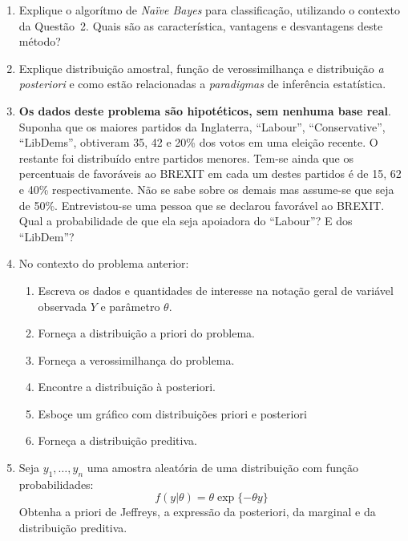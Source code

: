 \documentclass[11pt,a4]{article}\usepackage[]{graphicx}\usepackage[]{xcolor}
\begin{document}
\begin{enumerate}
\item Explique o algorítmo de {\it Naïve Bayes} para classificação, utilizando o contexto da Questão~2. Quais são as característica, vantagens e desvantagens deste método?
  

\item Explique distribuição amostral, função de verossimilhança e distribuição {\it a posteriori} e como estão relacionadas a {\it paradigmas} de inferência estatística.


 \item{ {\bf Os dados deste problema são hipotéticos, sem nenhuma base real}.\\
  Suponha que os maiores partidos da Inglaterra,
  ``Labour'', ``Conservative'', ``LibDems'',  obtiveram 35, 42 e 20\% dos votos em uma eleição recente.
  O restante foi distribuído entre partidos menores.
  Tem-se ainda que os percentuais de favoráveis ao BREXIT em cada um destes partidos é
  de 15, 62 e 40\% respectivamente. Não se sabe sobre os demais mas assume-se que seja de 50\%.
  Entrevistou-se uma pessoa que se declarou favorável ao BREXIT.
  Qual a probabilidade de que ela seja apoiadora do ``Labour''? E dos ``LibDem''?
  }
  

  
\item{ No contexto do problema anterior:
  \begin{enumerate}
  \item Escreva os dados e quantidades de interesse na notação geral de variável observada $Y$ e parâmetro $\theta$.
  \item Forneça a distribuição a priori do problema.
  \item Forneça a verossimilhança do problema.
  \item Encontre a distribuição à posteriori.
  \item Esboçe um gráfico com distribuições priori e posteriori
  \item Forneça a distribuição preditiva.
  \end{enumerate}
  }
  



  
\item Seja $y_1, \ldots, y_n$ uma amostra aleatória de uma distribuição com função probabilidades:
\[ f(y|\theta) = \theta \exp\{-\theta y\} \]
Obtenha a priori de Jeffreys, %
a expressão da posteriori, da marginal e da distribuição preditiva.




\end{enumerate}
\end{document}
